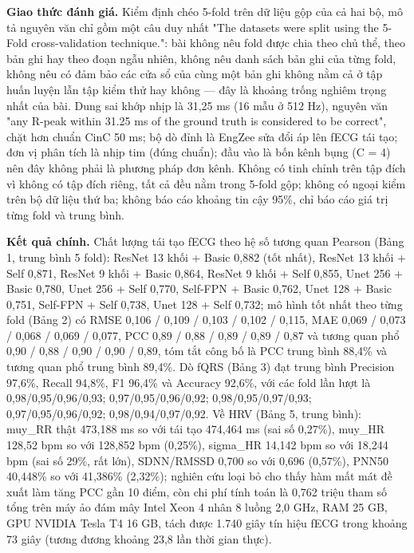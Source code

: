 \documentclass[12pt,a4paper]{article}
\begin{document}
\noindent \textbf{Giao thức đánh giá.} Kiểm định chéo 5-fold trên dữ liệu gộp của cả hai bộ, mô tả nguyên văn chỉ gồm một câu duy nhất "The datasets were split using the 5-Fold cross-validation technique.": bài không nêu fold được chia theo chủ thể, theo bản ghi hay theo đoạn ngẫu nhiên, không nêu danh sách bản ghi của từng fold, không nêu có đảm bảo các cửa sổ của cùng một bản ghi không nằm cả ở tập huấn luyện lẫn tập kiểm thử hay không — đây là khoảng trống nghiêm trọng nhất của bài. Dung sai khớp nhịp là 31,25 ms (16 mẫu ở 512 Hz), nguyên văn "any R-peak within 31.25 ms of the ground truth is considered to be correct", chặt hơn chuẩn CinC 50 ms; bộ dò đỉnh là EngZee sửa đổi áp lên fECG tái tạo; đơn vị phân tích là nhịp tim (đúng chuẩn); đầu vào là bốn kênh bụng (C = 4) nên đây không phải là phương pháp đơn kênh. Không có tinh chỉnh trên tập đích vì không có tập đích riêng, tất cả đều nằm trong 5-fold gộp; không có ngoại kiểm trên bộ dữ liệu thứ ba; không báo cáo khoảng tin cậy 95\%, chỉ báo cáo giá trị từng fold và trung bình.\par\vspace{3pt}
\noindent \textbf{Kết quả chính.} Chất lượng tái tạo fECG theo hệ số tương quan Pearson (Bảng 1, trung bình 5 fold): ResNet 13 khối + Basic 0,882 (tốt nhất), ResNet 13 khối + Self 0,871, ResNet 9 khối + Basic 0,864, ResNet 9 khối + Self 0,855, Unet 256 + Basic 0,780, Unet 256 + Self 0,770, Self-FPN + Basic 0,762, Unet 128 + Basic 0,751, Self-FPN + Self 0,738, Unet 128 + Self 0,732; mô hình tốt nhất theo từng fold (Bảng 2) có RMSE 0,106 / 0,109 / 0,103 / 0,102 / 0,115, MAE 0,069 / 0,073 / 0,068 / 0,069 / 0,077, PCC 0,89 / 0,88 / 0,89 / 0,89 / 0,87 và tương quan phổ 0,90 / 0,88 / 0,90 / 0,90 / 0,89, tóm tắt công bố là PCC trung bình 88,4\% và tương quan phổ trung bình 89,4\%. Dò fQRS (Bảng 3) đạt trung bình Precision 97,6\%, Recall 94,8\%, F1 96,4\% và Accuracy 92,6\%, với các fold lần lượt là 0,98/0,95/0,96/0,93; 0,97/0,95/0,96/0,92; 0,98/0,95/0,97/0,93; 0,97/0,95/0,96/0,92; 0,98/0,94/0,97/0,92. Về HRV (Bảng 5, trung bình): muy\_RR thật 473,188 ms so với tái tạo 474,464 ms (sai số 0,27\%), muy\_HR 128,52 bpm so với 128,852 bpm (0,25\%), sigma\_HR 14,142 bpm so với 18,244 bpm (sai số 29\%, rất lớn), SDNN/RMSSD 0,700 so với 0,696 (0,57\%), PNN50 40,448\% so với 41,386\% (2,32\%); nghiên cứu loại bỏ cho thấy hàm mất mát đề xuất làm tăng PCC gần 10 điểm, còn chi phí tính toán là 0,762 triệu tham số tổng trên máy ảo đám mây Intel Xeon 4 nhân 8 luồng 2,0 GHz, RAM 25 GB, GPU NVIDIA Tesla T4 16 GB, tách được 1.740 giây tín hiệu fECG trong khoảng 73 giây (tương đương khoảng 23,8 lần thời gian thực).\par\vspace{3pt}
\end{document}
